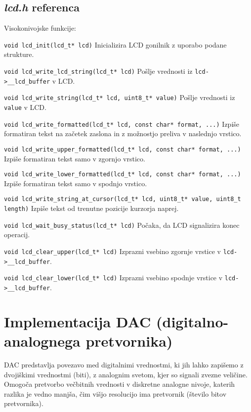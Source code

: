 \documentclass[12pt,a4paper,twoside,openright,slovene]{book}
\begin{document}
\subsection{\textit{lcd.h} referenca}

Visokonivojske funkcije:

\lstinline{void lcd_init(lcd_t* lcd)}\newline
Inicializira LCD gonilnik z uporabo podane strukture.

\lstinline{void lcd_write_lcd_string(lcd_t* lcd)}\newline
Pošlje vrednosti iz \lstinline{lcd->__lcd_buffer} v LCD.

\lstinline{void lcd_write_string(lcd_t* lcd, uint8_t* value)}\newline
Pošlje vrednosti iz \lstinline{value} v LCD.

\lstinline{void lcd_write_formatted(lcd_t* lcd, const char* format, ...)}\newline
Izpiše formatiran tekst na začetek zaslona in z možnostjo preliva v naslednjo vrstico.

\lstinline{void lcd_write_upper_formatted(lcd_t* lcd, const char* format, ...)}\newline
Izpiše formatiran tekst samo v zgornjo vrstico.

\lstinline{void lcd_write_lower_formatted(lcd_t* lcd, const char* format, ...)}\newline
Izpiše formatiran tekst samo v spodnjo vrstico.

\lstinline{void lcd_write_string_at_cursor(lcd_t* lcd, uint8_t* value, uint8_t length)}\newline
Izpiše tekst od trenutne pozicije kurzorja naprej.

\lstinline{void lcd_wait_busy_status(lcd_t* lcd)}\newline
Počaka, da LCD signalizira konec operacij.

\lstinline{void lcd_clear_upper(lcd_t* lcd)}\newline
Izprazni vsebino zgornje vrstice v \lstinline{lcd->__lcd_buffer}.

\lstinline{void lcd_clear_lower(lcd_t* lcd)}\newline
Izprazni vsebino spodnje vrstice v \lstinline{lcd->__lcd_buffer}.



\section{Implementacija DAC (digitalno-analognega pretvornika)}
DAC predstavlja povezavo med digitalnimi vrednostmi, ki jih lahko zapišemo z dvojiškimi vrednostmi (biti), z analognim svetom, kjer so signali zvezne veličine. Omogoča pretvorbo večbitnih vrednosti v diskretne analogne nivoje, katerih razlika je vedno manjša, čim višjo resolucijo ima pretvornik (število bitov pretvornika).
\end{document}
